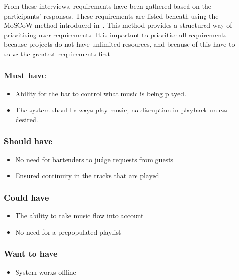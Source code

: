 From these interviews, requirements have been gathered based on the participants' responses. These requirements are listed beneath using the MoSCoW method introduced in~\cite{benyon2013designing}. This method provides a structured way of prioritising user requirements. It is important to prioritise all requirements because projects do not have unlimited resources, and because of this have to solve the greatest requirements first.

\subsubsection{Must have}

\begin{itemize}\label{musthave}
        \item Ability for the bar to control what music is being played.
        \item The system should always play music, no disruption in playback unless desired.
\end{itemize}

\subsubsection{Should have}

\begin{itemize}
        \item No need for bartenders to judge requests from guests
        \item Ensured continuity in the tracks that are played
\end{itemize}

\subsubsection{Could have}

\begin{itemize}
        \item The ability to take music flow into account
        \item No need for a prepopulated playlist
\end{itemize}

\subsubsection{Want to have}

\begin{itemize}
        \item System works offline
\end{itemize}
